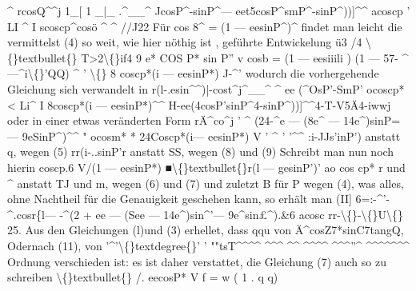 \documentclass[12pt,a4paper]{article}
\begin{document}
\^{}  rcosQ\^{}\^{}j  1\_[  1  \_|\_       .\^{}\_\_\^{} JcosP\^{}-sinP\^{}--- eet5cosP\^{}smP\^{}-sinP\^{}))]\^{}\^{} acoscp        '  LI  \^{}     I    scoscp\^{}cosö   \^{}  \^{}  //J22 Für    cos 8\^{}  =  (1  ---  eesinP\^{})\^{}   findet  man  leicht  die  vermittelst  (4)  so  weit,  wie hier  nöthig  ist ,  geführte  Entwickelung ü3  /4  \textbackslash\{\}textbullet\{\}      T>2\textbackslash\{\}if4  9  e*  COS  P*  sin  P''  v cosb    =  (1  ---  eesiiili  )  (1  ---   57-  \^{}---\^{}i\textbackslash\{\}'QQ) \^{}  '    \textbackslash\{\}  8  coscp*(i  --- eesinP*)    J-\^{}' wodurch  die  vorhergehende  Gleichung  sich  verwandelt  in r(l-.esin\^{}\^{})|-cost\^{}j\^{}\_\_\^{}        \^{} ee  (\^{}OsP'-SmP' ocoscp*  <  Li\^{}     I     8coscp*(i  ---  eesinP*)\^{}\^{} H-ee(4cosP'sinP\^{}4-sinP\^{}))]\^{}\^{}4-T-V5Ä4-iwwj oder  in  einer  etwas  veränderten  Form rÄ\^{}co\^{}j '  \^{}       (24-\^{}e  --- (8e\^{}  --- 14e\^{})sinP=--- 9eSinP\^{})\^{}\^{} "  ocosm*    *  24Coscp*(i--- eesinP*)  V       '  \^{}  '  '\^{}\^{} :i-JJs'inP')    anstatt  q,     wegen  (5) rr(i-..sinP'r    anstatt  SS,     wegen  (8)  und  (9) Schreibt  man  nun  noch  hierin coscp.6 V/(1  --- eesinP*) ■\textbackslash\{\}textbullet\{\}r(l  --- gesinP')' ao  cos  cp* r  und  \^{}  anstatt   TJ  und  m,     wegen  (6)  und  (7) und  zuletzt B  für  P  wegen  (4), was  alles,  ohne  Nachtheil  für  die  Genauigkeit  geschehen  kann,  so  erhält  man  (II] 6=:-\^{}'-\^{}.cosr\{l--- -\^{}(2  +  ee  --- (See  --- 14e\^{})sin\^{}'--- 9e\^{}sin£\^{}).\&6 acosc rr-\textbackslash\{\}-\textbackslash\{\}U\textbackslash\{\} 25. Aus  den  Gleichungen  (l)und  (3)  erhellet,  dass  qqu  von  Ä\^{}cosZ7*sinC7tangQ, Odernach  (11),  von   '\^{}'\textbackslash\{\}textdegree\{\}' '  ""tsT\^{}\^{}\^{}\^{}   \^{}\^{}\^{}  \^{}\^{}  \^{}\^{}\^{}\^{}  \^{}\^{}\^{}''\^{}  \^{}\^{}\^{}\^{}\^{}\^{}\^{}  Ordnung verschieden  ist:  es  ist  daher  verstattet,  die  Gleichung  (7)  auch  so  zu  schreiben \textbackslash\{\}textbullet\{\}  /.         eecosP*  V f  =  w  ( 1 .  q  q)
\end{document}
